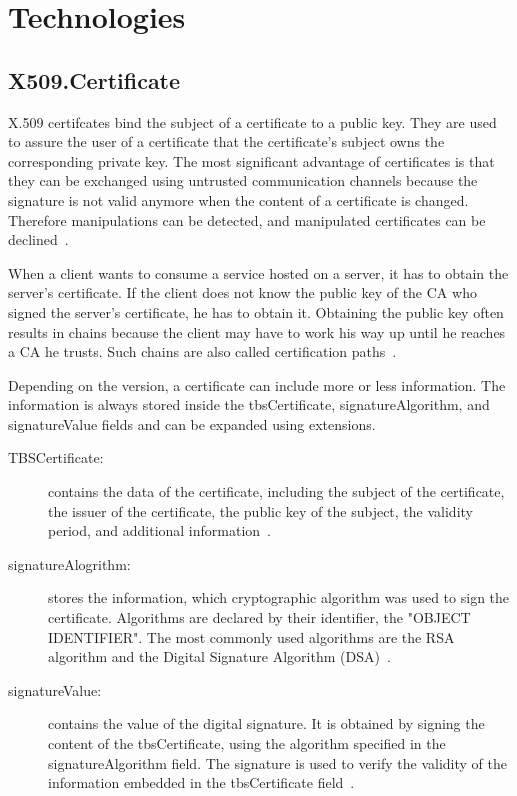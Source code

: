 
\section{Technologies}
\subsection{X509.Certificate}
X.509 certifcates bind the subject of a certificate to a public key.
They are used to assure the user of a certificate that the certificate's subject owns the corresponding private key.
The most significant advantage of certificates is that they can be exchanged using untrusted communication channels because the signature is not valid anymore when the content of a certificate is changed.
Therefore manipulations can be detected, and manipulated certificates can be declined~\cite{x509rfc}.

When a client wants to consume a service hosted on a server, it has to obtain the server's certificate.
If the client does not know the public key of the CA who signed the server's certificate, he has to obtain it.
Obtaining the public key often results in chains because the client may have to work his way up until he reaches a CA he trusts.
Such chains are also called certification paths~\cite{x509rfc}.

Depending on the version, a certificate can include more or less information.
The information is always stored inside the tbsCertificate, signatureAlgorithm, and signatureValue fields and can be expanded using extensions.
\begin{description}
	\item[TBSCertificate:] contains the data of the certificate, including the subject of the certificate, the issuer of the certificate, the public key of the subject, the validity period, and additional information~\cite{x509rfc}.
	\item[signatureAlogrithm:] stores the information, which cryptographic algorithm was used to sign the certificate.
		Algorithms are declared by their identifier, the "OBJECT IDENTIFIER".
		The most commonly used algorithms are the RSA algorithm and the Digital Signature Algorithm (DSA)~\cite{x509rfc}.
	\item[signatureValue:] contains the value of the digital signature.
		It is obtained by signing the content of the tbsCertificate, using the algorithm specified in the signatureAlgorithm field.
		The signature is used to verify the validity of the information embedded in the tbsCertificate field~\cite{x509rfc}.
\end{description}

